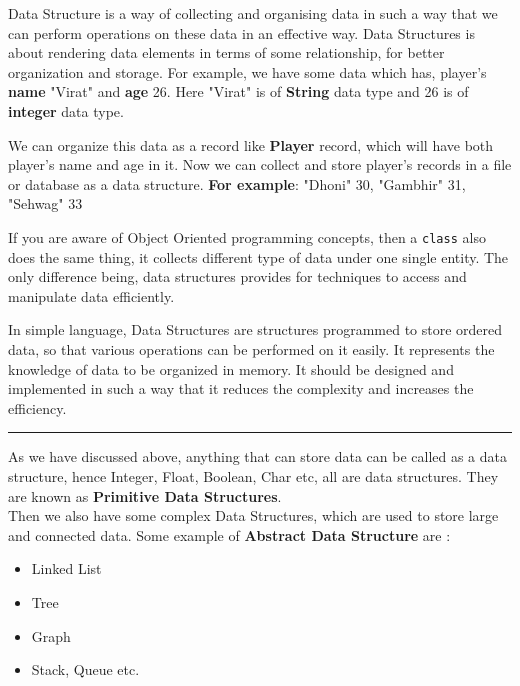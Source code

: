\newpage
\hypertarget{body-content}{}
\hypertarget{introduction-to-data-structures-and-algorithms}{%
	\label{introduction-to-data-structures-and-algorithms}}

Data Structure is a way of collecting and organising data in such a way
that we can perform operations on these data in an effective way. Data
Structures is about rendering data elements in terms of some
relationship, for better organization and storage. For example, we have
some data which has, player's \textbf{name} "Virat" and \textbf{age} 26.
Here "Virat" is of \textbf{String} data type and 26 is of
\textbf{integer} data type.

We can organize this data as a record like \textbf{Player} record, which
will have both player's name and age in it. Now we can collect and store
player's records in a file or database as a data structure. \textbf{For
example}: "Dhoni" 30, "Gambhir" 31, "Sehwag" 33

If you are aware of Object Oriented programming concepts, then a
\texttt{class} also does the same thing, it collects different type of
data under one single entity. The only difference being, data structures
provides for techniques to access and manipulate data efficiently.

In simple language, Data Structures are structures programmed to store
ordered data, so that various operations can be performed on it easily.
It represents the knowledge of data to be organized in memory. It should
be designed and implemented in such a way that it reduces the complexity
and increases the efficiency.

\begin{center}\rule{0.5\linewidth}{0.5pt}\end{center}

\hypertarget{basic-types-of-data-structures}{%
	\label{basic-types-of-data-structures}}

As we have discussed above, anything that can store data can be called
as a data structure, hence Integer, Float, Boolean, Char etc, all are
data structures. They are known as \textbf{Primitive Data Structures}.\\

Then we also have some complex Data Structures, which are used to store
large and connected data. Some example of \textbf{Abstract Data
Structure} are :

\begin{itemize}
	\tightlist
	\item
	      Linked List
	\item
	      Tree
	\item
	      Graph
	\item
	      Stack, Queue etc.
\end{itemize}

